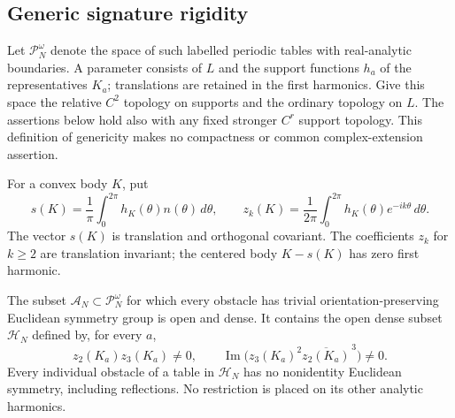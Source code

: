 \subsection{Generic signature rigidity}

Let $\mathscr P_N^\omega$ denote the space of such labelled periodic tables
with real-analytic boundaries.  A parameter consists of $L$ and the support
functions $h_a$ of the representatives $K_a$; translations are retained in
the first harmonics.  Give this space the relative $C^2$ topology on supports
and the ordinary topology on $L$.  The assertions below hold also with any
fixed stronger $C^r$ support topology.  This definition of genericity makes
no compactness or common complex-extension assertion.

For a convex body $K$, put
\[
 s(K)=\frac1\pi\int_0^{2\pi}h_K(\theta)n(\theta)\,d\theta,
 \qquad
 z_k(K)=\frac1{2\pi}\int_0^{2\pi}h_K(\theta)e^{-ik\theta}\,d\theta.
\]
The vector $s(K)$ is translation and orthogonal covariant.  The coefficients
$z_k$ for $k\ge2$ are translation invariant; the centered body $K-s(K)$
has zero first harmonic.

\begin{proposition}
\label{prop:v45-generic-asymmetry}
The subset $\mathscr A_N\subset\mathscr P_N^\omega$ for which every
obstacle has trivial orientation-preserving Euclidean symmetry group is
open and dense.  It contains the open dense subset $\mathscr H_N$ defined
by, for every $a$,
\begin{equation}\label{eq:v45-harmonic-generic-set}
 z_2(K_a)z_3(K_a)\ne0,
 \qquad
 \operatorname{Im}\bigl(z_3(K_a)^2\overline{z_2(K_a)}^{\,3}\bigr)\ne0.
\end{equation}
Every individual obstacle of a table in $\mathscr H_N$ has no nonidentity
Euclidean symmetry, including reflections.  No restriction is placed on
its other analytic harmonics.
\end{proposition}

